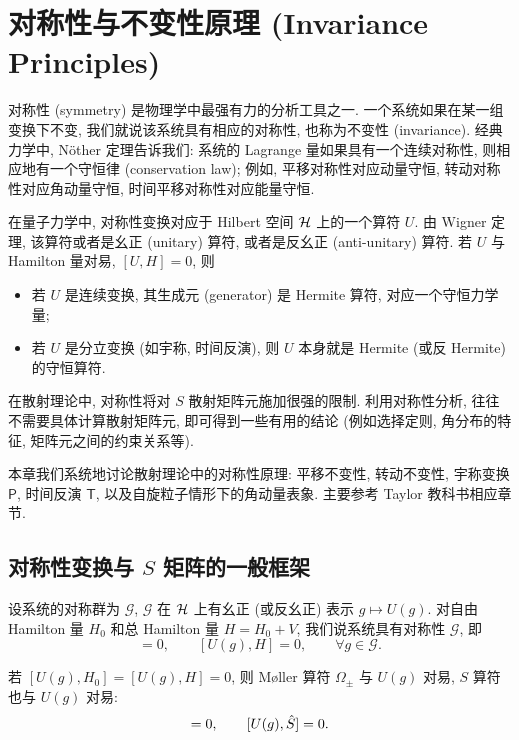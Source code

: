 \chapter{对称性与不变性原理 (Invariance Principles)}\label{ch:invariance}

对称性 (symmetry) 是物理学中最强有力的分析工具之一. 一个系统如果在某一组变换下不变, 我们就说该系统具有相应的对称性, 也称为不变性 (invariance). 经典力学中, Nöther 定理告诉我们: 系统的 Lagrange 量如果具有一个连续对称性, 则相应地有一个守恒律 (conservation law); 例如, 平移对称性对应动量守恒, 转动对称性对应角动量守恒, 时间平移对称性对应能量守恒.

在量子力学中, 对称性变换对应于 Hilbert 空间 $\mathcal{H}$ 上的一个算符 $U$. 由 Wigner 定理, 该算符或者是幺正 (unitary) 算符, 或者是反幺正 (anti-unitary) 算符. 若 $U$ 与 Hamilton 量对易, $[U,H]=0$, 则
\begin{itemize}
  \item 若 $U$ 是连续变换, 其生成元 (generator) 是 Hermite 算符, 对应一个守恒力学量;
  \item 若 $U$ 是分立变换 (如宇称, 时间反演), 则 $U$ 本身就是 Hermite (或反 Hermite) 的守恒算符.
\end{itemize}

在散射理论中, 对称性将对 $S$ 散射矩阵元施加很强的限制. 利用对称性分析, 往往不需要具体计算散射矩阵元, 即可得到一些有用的结论 (例如选择定则, 角分布的特征, 矩阵元之间的约束关系等).

本章我们系统地讨论散射理论中的对称性原理: 平移不变性, 转动不变性, 宇称变换 $\mathsf{P}$, 时间反演 $\mathsf{T}$, 以及自旋粒子情形下的角动量表象. 主要参考 Taylor 教科书相应章节.


\section{对称性变换与 \texorpdfstring{$S$}{S} 矩阵的一般框架}

设系统的对称群为 $\mathcal{G}$, $\mathcal{G}$ 在 $\mathcal{H}$ 上有幺正 (或反幺正) 表示 $g\mapsto U(g)$. 对自由 Hamilton 量 $H_0$ 和总 Hamilton 量 $H=H_0+V$, 我们说系统具有对称性 $\mathcal{G}$, 即
\begin{equation}
[U(g),H_0]=0, \qquad [U(g),H]=0, \qquad \forall g\in\mathcal{G}.
\end{equation}

\begin{theorem}[对称性与 $S$ 算符]\label{thm:symS}
若 $[U(g),H_0]=[U(g),H]=0$, 则 Møller 算符 $\Omega_\pm$ 与 $U(g)$ 对易, $S$ 算符也与 $U(g)$ 对易:
\begin{equation}
[U(g),\Omega_\pm]=0, \qquad [U(g),\Smat]=0.
\end{equation}
\end{theorem}


